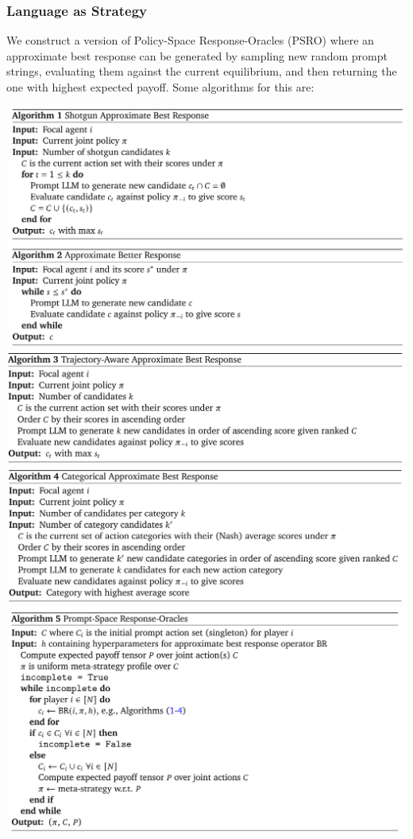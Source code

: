 \documentclass[12pt]{article}
\begin{document}
\subsubsection{Language as Strategy}
We construct a version of Policy-Space Response-Oracles (PSRO) where an approximate best response can be generated by sampling new random prompt strings, evaluating them against the current equilibrium, and then returning the one with highest expected payoff. Some algorithms for this are:
\begin{center}
  \includegraphics*[scale = 0.5]{fig4.png}
  \includegraphics*[scale = 0.5]{fig5.png}
  \includegraphics*[scale = 0.5]{fig6.png}
  \includegraphics*[scale = 0.5]{fig7.png}
\end{center}
\end{document}
